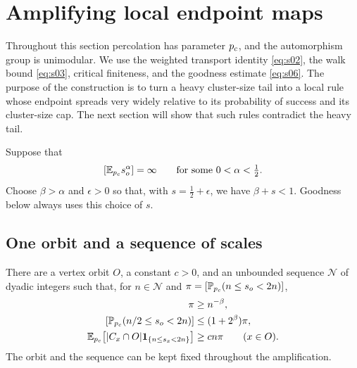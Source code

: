 \section{Amplifying local endpoint maps}\label{amp:section}

Throughout this section percolation has parameter ${p_c}$, and the automorphism
group is unimodular.  We use the weighted transport identity
\eqref{eq:s02}, the walk bound \eqref{eq:s03}, critical finiteness, and the
goodness estimate \eqref{eq:s06}.  The purpose of the construction is to turn
a heavy cluster-size tail into a local rule whose endpoint spreads very
widely relative to its probability of success and its cluster-size cap.
The next section will show that such rules contradict the heavy tail.

Suppose that
\begin{equation}\label{eq:s09}
 [\mathbb E_{{p_c}}s_o^\alpha]=\infty
 \qquad\text{for some }0<\alpha<\tfrac12.
\end{equation}
Choose $\beta>\alpha$ and $\epsilon>0$ so that, with
$s=\tfrac12+\epsilon$, we have $\beta+s<1$.  Goodness below always uses this
choice of $s$.

\subsection{One orbit and a sequence of scales}\label{amp:scales-section}

\begin{lemma}\label{amp:scales}
There are a vertex orbit $O$, a constant $c>0$, and an unbounded sequence
$\mathcal N$ of dyadic integers such that, for $n\in\mathcal N$ and
$\pi=[\mathbb P_{{p_c}}(n\le s_o<2n)]$,
\begin{equation}\label{eq:s10}
 \begin{split}
 \pi&\ge n^{-\beta},\\
 [\Prob_{\pc}(n/2\le s_o<2n)]&\le(1+2^\beta)\pi,\\
 \E_{\pc}\bigl[|C_x\cap O|\one_{\{n\le s_x<2n\}}\bigr]
     &\ge c n\pi\qquad(x\in O).
 \end{split}
\end{equation}
The orbit and the sequence can be kept fixed throughout the amplification.
\end{lemma}

